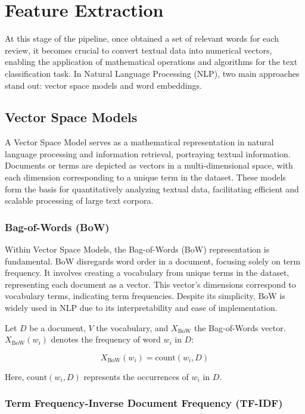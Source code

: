 
\section{Feature Extraction}
\label{sec:embeddings}

At this stage of the pipeline, once obtained a set of relevant words for each review, it becomes crucial to convert textual data into numerical vectors, enabling the application of mathematical operations and algorithms for the text classification task. In Natural Language Processing (NLP), two main approaches stand out: vector space models and word embeddings.


\subsection{Vector Space Models}

A Vector Space Model serves as a mathematical representation in natural language processing and information retrieval, portraying textual information. Documents or terms are depicted as vectors in a multi-dimensional space, with each dimension corresponding to a unique term in the dataset. These models form the basis for quantitatively analyzing textual data, facilitating efficient and scalable processing of large text corpora.


\subsubsection{Bag-of-Words (BoW)}

Within Vector Space Models, the Bag-of-Words (BoW) representation is fundamental. BoW disregards word order in a document, focusing solely on term frequency. It involves creating a vocabulary from unique terms in the dataset, representing each document as a vector. This vector's dimensions correspond to vocabulary terms, indicating term frequencies. Despite its simplicity, BoW is widely used in NLP due to its interpretability and ease of implementation.

Let $D$ be a document, $V$ the vocabulary, and $X_{\text{BoW}}$ the Bag-of-Words vector. $X_{\text{BoW}}(w_i)$ denotes the frequency of word $w_i$ in $D$:

\[
X_{\text{BoW}}(w_i) = \text{count}(w_i, D)
\]

Here, $\text{count}(w_i, D)$ represents the occurrences of $w_i$ in $D$.

\subsubsection{Term Frequency-Inverse Document Frequency (TF-IDF)}

